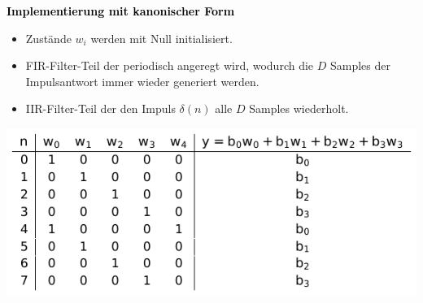 		\begin{minipage}{0.485\textwidth}
		\textbf{\textcolor{black}{\large{Implementierung mit kanonischer Form}}}\\[-0.2cm]
			\begin{itemize}
			 \item Zustände $w_i$ werden mit Null initialisiert.\\[-0.4cm]
			 \item FIR-Filter-Teil der periodisch angeregt wird, wodurch die $D$ Samples der Impulsantwort immer wieder generiert werden.\\[-0.4cm]
			 \item IIR-Filter-Teil der den Impuls $\delta(n)$ alle $D$ Samples wiederholt.\\[-0.1cm]
			\end{itemize}
			\hspace*{0.3cm}\includegraphics[width = \textwidth]{pic/TabelleKanonischeform.pdf}
		\end{minipage}\begin{minipage}{0.03\textwidth}$ $\end{minipage}
